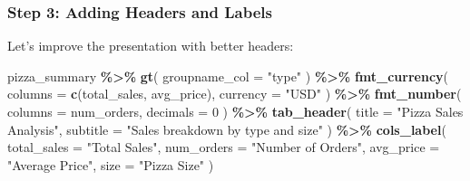 \documentclass[
]{article}
\newenvironment{Shaded}{\begin{snugshade}}{\end{snugshade}}
\newcommand{\AttributeTok}[1]{\textcolor[rgb]{0.13,0.29,0.53}{#1}}
\newcommand{\DecValTok}[1]{\textcolor[rgb]{0.00,0.00,0.81}{#1}}
\newcommand{\FunctionTok}[1]{\textcolor[rgb]{0.13,0.29,0.53}{\textbf{#1}}}
\newcommand{\NormalTok}[1]{#1}
\newcommand{\SpecialCharTok}[1]{\textcolor[rgb]{0.81,0.36,0.00}{\textbf{#1}}}
\newcommand{\StringTok}[1]{\textcolor[rgb]{0.31,0.60,0.02}{#1}}
\begin{document}
\subsubsection{Step 3: Adding Headers and
Labels}\label{step-3-adding-headers-and-labels}

Let's improve the presentation with better headers:

\begin{Shaded}
\begin{Highlighting}[]
\NormalTok{pizza\_summary }\SpecialCharTok{\%\textgreater{}\%}
  \FunctionTok{gt}\NormalTok{(}
    \AttributeTok{groupname\_col =} \StringTok{"type"}
\NormalTok{  ) }\SpecialCharTok{\%\textgreater{}\%}
  \FunctionTok{fmt\_currency}\NormalTok{(}
    \AttributeTok{columns =} \FunctionTok{c}\NormalTok{(total\_sales, avg\_price),}
    \AttributeTok{currency =} \StringTok{"USD"}
\NormalTok{  ) }\SpecialCharTok{\%\textgreater{}\%}
  \FunctionTok{fmt\_number}\NormalTok{(}
    \AttributeTok{columns =}\NormalTok{ num\_orders,}
    \AttributeTok{decimals =} \DecValTok{0}
\NormalTok{  ) }\SpecialCharTok{\%\textgreater{}\%}
  \FunctionTok{tab\_header}\NormalTok{(}
    \AttributeTok{title =} \StringTok{"Pizza Sales Analysis"}\NormalTok{,}
    \AttributeTok{subtitle =} \StringTok{"Sales breakdown by type and size"}
\NormalTok{  ) }\SpecialCharTok{\%\textgreater{}\%}
  \FunctionTok{cols\_label}\NormalTok{(}
    \AttributeTok{total\_sales =} \StringTok{"Total Sales"}\NormalTok{,}
    \AttributeTok{num\_orders =} \StringTok{"Number of Orders"}\NormalTok{,}
    \AttributeTok{avg\_price =} \StringTok{"Average Price"}\NormalTok{,}
    \AttributeTok{size =} \StringTok{"Pizza Size"}
\NormalTok{  )}
\end{Highlighting}
\end{Shaded}
\end{document}
